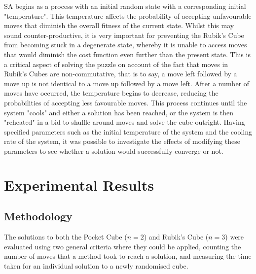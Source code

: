 \documentclass[UKenglish]{svproc}
\begin{document}
SA begins as a process with an initial random state with a corresponding initial "temperature". This temperature affects the probability of accepting unfavourable moves that diminish the overall fitness of the current state. Whilst this may sound counter-productive, it is very important for preventing the Rubik's Cube from becoming stuck in a degenerate state, whereby it is unable to access moves that would diminish the cost function even further than the present state. This is a critical aspect of solving the puzzle on account of the fact that moves in Rubik's Cubes are non-commutative, that is to say, a move left followed by a move up is not identical to a move up followed by a move left. After a number of moves have occurred, the temperature begins to decrease, reducing the probabilities of accepting less favourable moves. This process continues until the system "cools" and either a solution has been reached, or the system is then "reheated" in a bid to shuffle around moves and solve the cube outright. Having specified parameters such as the initial temperature of the system and the cooling rate of the system, it was possible to investigate the effects of modifying these parameters to see whether a solution would successfully converge or not.



\section{Experimental Results}

\subsection{Methodology}
The solutions to both the Pocket Cube ($n=2$) and Rubik's Cube ($n=3$) were evaluated using two general criteria where they could be applied, counting the number of moves that a method took to reach a solution, and measuring the time taken for an individual solution to a newly randomised cube.
\end{document}
